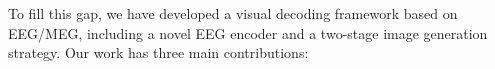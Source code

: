 \documentclass{article}
\newcommand{\todo}[1]{\textcolor{red}{TODO: #1}}
\begin{document}
    




To fill this gap, we have developed a visual decoding framework based on EEG/MEG, including a novel EEG encoder and a two-stage image generation strategy. Our work has three main contributions:
\end{document}
